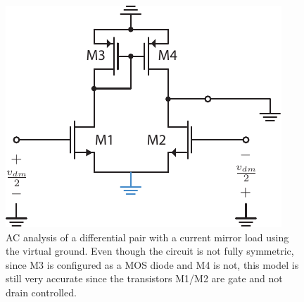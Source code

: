 \begin{figure}[tb]
\begin{center}
\includegraphics[scale=1]{Diffpair_se_ac_gm.pdf} 
\end{center}
\caption{AC analysis of a differential pair with a current mirror load using the virtual ground.  Even though the circuit is not fully symmetric, since M3 is configured as a MOS diode and M4 is not, this model is still very accurate since the transistors M1/M2 are gate and not drain controlled.} \label{fig:Diffpair_se_ac_gm.pdf}
\end{figure}

